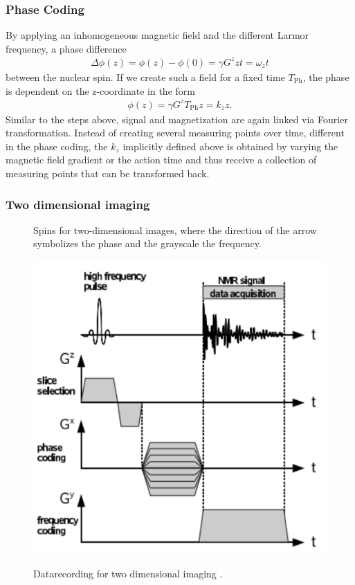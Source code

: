 \subsubsection{Phase Coding}
By applying an inhomogeneous magnetic field and the different Larmor frequency, a phase difference
\begin{align}
\Delta \phi(z)=\phi(z)-\phi(0)=\gamma G^z zt=\omega_z t
\end{align}
between the nuclear spin.
If we create such a field for a fixed time $T_\text{Ph}$, the phase is dependent on the z-coordinate in the form
\begin{align}
\phi(z)=\gamma G^z T_\text{Ph} z=k_z z.
\end{align}
Similar to the steps above, signal and magnetization are again linked via Fourier transformation.
Instead of creating several measuring points over time, different
in the phase coding, the $k_z$ implicitly defined above is obtained by varying the magnetic field gradient
or the action time and thus receive a collection of measuring points that can be transformed back.

\subsubsection{Two dimensional imaging}

\begin{figure}[ht]
\centering

\label{fig:phase}
\caption{Spins for two-dimensional images, where the direction of the arrow symbolizes the phase and the grayscale the frequency.}
\end{figure}

\begin{figure}[ht]
\centering
\includegraphics[scale=.25]{images//signal.png}
\label{fig:signal}
\caption{Datarecording for two dimensional imaging \cite{script_nmr}.}
\end{figure}